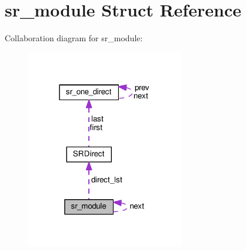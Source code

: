 \hypertarget{structsr__module}{}\section{sr\+\_\+module Struct Reference}
\label{structsr__module}


Collaboration diagram for sr\+\_\+module\+:\nopagebreak
\begin{figure}[H]
\begin{center}
\leavevmode
\includegraphics[width=195pt]{structsr__module__coll__graph}
\end{center}
\end{figure}
